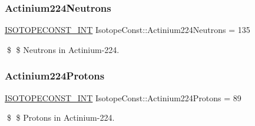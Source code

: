 \subsubsection{\texorpdfstring{Actinium224\+Neutrons}{Actinium224Neutrons}}
{\footnotesize\ttfamily \mbox{\hyperlink{group___isotope_const-_macros_ga5f18360b3e99483a35c32d789e62621c}{I\+S\+O\+T\+O\+P\+E\+C\+O\+N\+S\+T\+\_\+\+I\+NT}} Isotope\+Const\+::\+Actinium224\+Neutrons = 135}

\$ \$ Neutrons in Actinium-\/224. \mbox{\label{group___isotope_const-_actinium-_ac224_ga47ed6e9f7cf27c4d98bd094947201a89}} 
\subsubsection{\texorpdfstring{Actinium224\+Protons}{Actinium224Protons}}
{\footnotesize\ttfamily \mbox{\hyperlink{group___isotope_const-_macros_ga5f18360b3e99483a35c32d789e62621c}{I\+S\+O\+T\+O\+P\+E\+C\+O\+N\+S\+T\+\_\+\+I\+NT}} Isotope\+Const\+::\+Actinium224\+Protons = 89}

\$ \$ Protons in Actinium-\/224. 